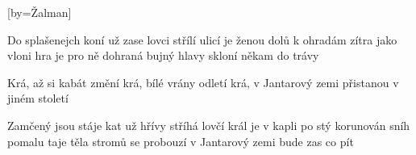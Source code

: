 [by={Žalman}]

\beginverse{}
Do splašenejch koní už zase lovci střílí
ulicí je ženou dolů k ohradám
zítra jako vloni hra je pro ně dohraná
bujný hlavy skloní někam do trávy
\endverse{}

\beginchorus{}
Krá, až si kabát změní
krá, bílé vrány odletí 
krá, v Jantarový zemi 
přistanou v jiném století
\endchorus{}

\beginverse*{}
    
\endverse{}

\beginverse{}
Zamčený jsou stáje kat už hřívy stříhá
lovčí král je v kapli po stý korunován
sníh pomalu taje těla stromů se probouzí
v Jantarový zemi bude zas co pít
\endverse{}

\endsong{}
